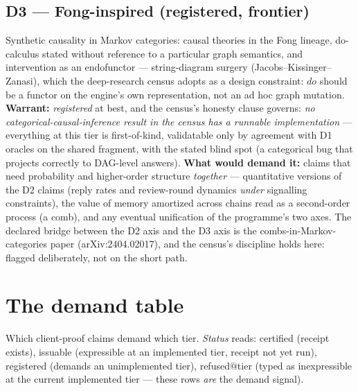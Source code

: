 \documentclass[11pt]{article}
\newcommand{\warrant}[1]{\textsl{#1}}
\begin{document}
\subsection*{D3 --- Fong-inspired (registered, frontier)}

Synthetic causality in Markov categories: causal theories in the
Fong lineage, do-calculus stated without reference to a particular
graph semantics, and intervention as an endofunctor --- string-diagram
surgery (Jacobs--Kissinger--Zanasi), which the deep-research census
adopts as a design constraint: $do$ should be a functor on the
engine's own representation, not an ad hoc graph mutation.
\textbf{Warrant:} \warrant{registered} at best, and the census's
honesty clause governs: \emph{no categorical-causal-inference
result in the census has a runnable implementation} --- everything
at this tier is first-of-kind, validatable only by agreement with
D1 oracles on the shared fragment, with the stated blind spot (a
categorical bug that projects correctly to DAG-level answers).
\textbf{What would demand it:} claims that need probability and
higher-order structure \emph{together} --- quantitative versions of
the D2 claims (reply rates and review-round dynamics \emph{under}
signalling constraints), the value of memory amortized across
chains read as a second-order process (a comb), and any eventual
unification of the programme's two axes. The declared bridge
between the D2 axis and the D3 axis is the combs-in-Markov-categories
paper (arXiv:2404.02017), and the census's discipline holds here:
flagged deliberately, not on the short path.

\section{The demand table}

Which client-proof claims demand which tier. \emph{Status} reads:
certified (receipt exists), issuable (expressible at an implemented
tier, receipt not yet run), registered (demands an unimplemented
tier), refused$@$tier (typed as inexpressible at the current
implemented tier --- these rows \emph{are} the demand signal).
\end{document}
